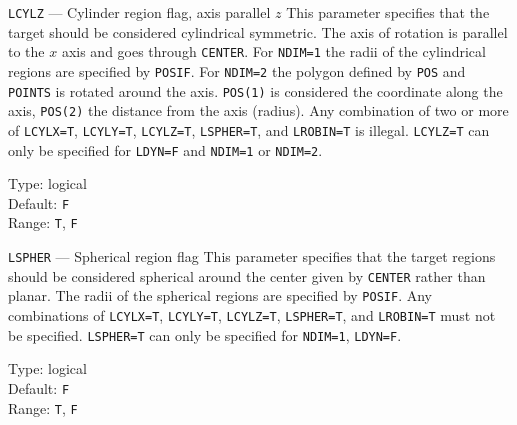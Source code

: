 \begin{keydescription}{\texttt{LCYLZ} --- Cylinder region flag, axis parallel $z$}
%
  This parameter specifies that the target should be considered cylindrical 
  symmetric. The axis of rotation is parallel to the $x$ axis and goes through 
  \texttt{CENTER}. For \texttt{NDIM=1} the radii of the 
  cylindrical regions are specified by \texttt{POSIF}. For \texttt{NDIM=2}
  the polygon defined by \texttt{POS} and \texttt{POINTS} is rotated around 
  the axis. \texttt{POS(1)} is considered the coordinate along the axis, 
  \texttt{POS(2)} the distance from the axis (radius). Any combination of two
  or more of \texttt{LCYLX=T}, \texttt{LCYLY=T}, \texttt{LCYLZ=T}, 
  \texttt{LSPHER=T}, and \texttt{LROBIN=T} is illegal. \texttt{LCYLZ=T} can 
  only be specified for \texttt{LDYN=F} and \texttt{NDIM=1} or \texttt{NDIM=2}.
  \begin{keytab}
    Type:    \> logical \\
    Default: \> \texttt{F} \\
    Range:   \> \texttt{T}, \texttt{F} 
  \end{keytab}
\end{keydescription}

\begin{keydescription}{\texttt{LSPHER} --- Spherical region flag}
%
  This parameter specifies that the target regions should be
  considered spherical around the center given by \texttt{CENTER} rather than 
  planar. The radii of the spherical regions are specified by \texttt{POSIF}. 
  Any combinations of \texttt{LCYLX=T}, \texttt{LCYLY=T}, \texttt{LCYLZ=T}, 
  \texttt{LSPHER=T}, and \texttt{LROBIN=T} must not be specified. 
  \texttt{LSPHER=T} can only be specified for \texttt{NDIM=1}, \texttt{LDYN=F}.
  \begin{keytab}
    Type:    \> logical \\
    Default: \> \texttt{F} \\
    Range:   \> \texttt{T}, \texttt{F} 
  \end{keytab}
\end{keydescription}

